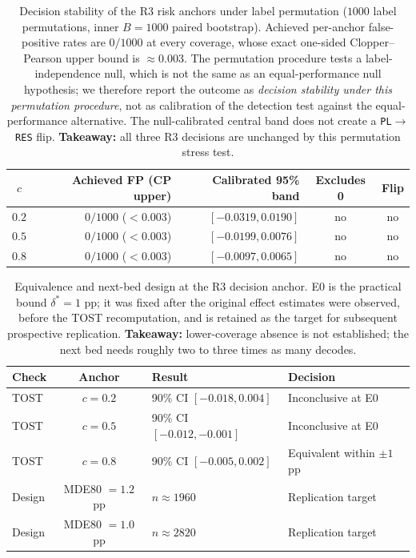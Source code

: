 \documentclass{article}
\begin{document}
\begin{table}[t]
\caption{Decision stability of the R3 risk anchors under label permutation ($1000$ label
permutations, inner $B=1000$ paired bootstrap).  Achieved per-anchor false-positive rates are
$0/1000$ at every coverage, whose exact one-sided Clopper--Pearson upper bound is
$\approx0.003$.  The permutation procedure tests a label-independence null, which is not the
same as an equal-performance null hypothesis; we therefore report the outcome as
\emph{decision stability under this permutation procedure}, not as calibration of the
detection test against the equal-performance alternative.  The null-calibrated central band
does not create a \texttt{PL}$\rightarrow$\texttt{RES} flip.  \textbf{Takeaway:} all three R3
decisions are unchanged by this permutation stress test.}
\label{tab:nullcal}
\centering\small
\begin{tabular}{@{}crrcc@{}}
\toprule
$c$ & Achieved FP (CP upper) & Calibrated 95\% band & Excludes 0 & Flip \\
\midrule
$0.2$ & $0/1000$ ($<0.003$) & $[-0.0319,0.0190]$ & no & no \\
$0.5$ & $0/1000$ ($<0.003$) & $[-0.0199,0.0076]$ & no & no \\
$0.8$ & $0/1000$ ($<0.003$) & $[-0.0097,0.0065]$ & no & no \\
\bottomrule
\end{tabular}
\end{table}

\begin{table}[t]
\caption{Equivalence and next-bed design at the R3 decision anchor.  E0 is the practical
bound $\delta^*=1$ pp; it was fixed after the original effect estimates were observed, before
the TOST recomputation, and is retained as the target for subsequent prospective replication.
\textbf{Takeaway:} lower-coverage absence is not established; the next bed needs roughly two
to three times as many decodes.}
\label{tab:powerplan}
\centering\small
\begin{tabularx}{\linewidth}{@{}lcl>{\raggedright\arraybackslash}X@{}}
\toprule
Check & Anchor & Result & Decision \\
\midrule
TOST & $c=0.2$ & 90\% CI $[-0.018,0.004]$ & Inconclusive at E0 \\
TOST & $c=0.5$ & 90\% CI $[-0.012,-0.001]$ & Inconclusive at E0 \\
TOST & $c=0.8$ & 90\% CI $[-0.005,0.002]$ & Equivalent within $\pm1$ pp \\
Design & MDE80 $=1.2$ pp & $n\approx1960$ & Replication target \\
Design & MDE80 $=1.0$ pp & $n\approx2820$ & Replication target \\
\bottomrule
\end{tabularx}
\end{table}
\end{document}
